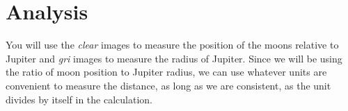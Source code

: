 %
%
%
\section{Analysis}

You will use the \textit{clear} images to measure the position of the moons relative to Jupiter and
\textit{gri} images to measure the radius of Jupiter. Since we will be using the ratio of moon position to Jupiter radius, we can use whatever units are convenient to measure the distance, as long as we are consistent, as the unit divides by itself in the calculation.

